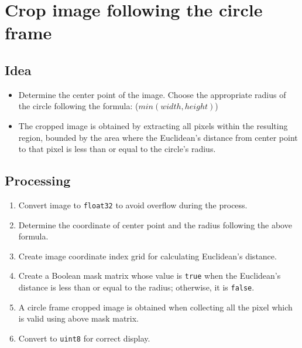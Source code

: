 \chapter{Crop image following the circle frame}

\section{Idea}
\begin{itemize}
    \item Determine the center point of the image. Choose the appropriate radius of the circle following the formula: ($min(width, height)$)
    \item The cropped image is obtained by extracting all pixels within the resulting region, bounded by the area where the Euclidean's distance \cite{euclide_distance} from center point to that pixel is less than or equal to the circle's radius.
\end{itemize}

\section{Processing}
\begin{enumerate}
    \item Convert image to \texttt{float32} to avoid overflow during the process.
    \item Determine the coordinate of center point and the radius following the above formula.
    \item Create image coordinate index grid for calculating Euclidean's distance.
    \item Create a Boolean mask matrix whose value is \texttt{true} when the Euclidean's distance is less than or equal to the radius; otherwise, it is \texttt{false}.
    \item A circle frame cropped image is obtained when collecting all the pixel which is valid using above mask matrix.
    \item Convert to \texttt{uint8} for correct display.
\end{enumerate}

\newpage

